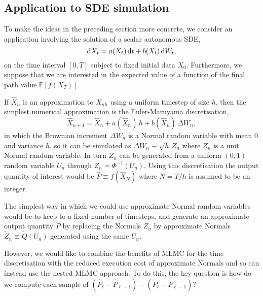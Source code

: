 \documentclass[review]{siamart190516}
\def \EE {{\mathbb{E}}}
\def \D {{\rm d}}
\def \tP {{\widetilde{P}}}
\def \tQ {{\widetilde{Q}}}
\def \tZ {{\widetilde{Z}}}
\def \hP {{\widehat{P}}}
\def \hX {{\widehat{X}}}
\def \hXn {{\widehat{X}_n}}
\def \hXnp {{\widehat{X}_{n+1}}}
\begin{document}
\subsection{Application to SDE simulation}

To make the ideas in the preceding section more concrete, we consider
an application involving the solution of a scalar autonomous SDE,
\[
\D X_t = a(X_t)\, \D t + b(X_t)\, \D W_t,
\]
on the time interval $[0,T]$ subject to fixed initial data $X_0$.
Furthermore, we suppose that we are interested in the expected
value of a function of the final path value $\EE[f(X_T)]$.

If $\hXn$ is an approximation to $X_{nh}$ using a uniform timestep of size $h$,
then the simplest numerical approximation is the Euler-Maruyama discretisation,
\[
\hXnp = \hXn + a(\hXn)\, h + b(\hXn)\, \Delta W_n,
\]
in which the Brownian increment $\Delta W_n$ is a Normal random
variable with mean 0 and variance $h$, so it can be simulated as
$
\Delta W_n \equiv \sqrt{h}\, Z_n
$
where $Z_n$ is a unit Normal random variable.  In turn $Z_n$ can 
be generated from a uniform $(0,1)$ random variable $U_n$ through 
$Z_n = \Phi^{-1}(U_n)$.
Using this discretisation the output quantity of interest would
be $\hP \equiv f(\hX_N)$ where $N = T/h$ is assumed to be an integer.

The simplest way in which we could use approximate Normal random
variables would be to keep to a fixed number of timesteps, and
generate an approximate output quantity $\tP$ by replacing the
Normals $Z_n$ by approximate Normals $\tZ_n \equiv \tQ(U_n)$
generated using the same $U_n$.

However, we would like to combine the benefits of MLMC for the time
discretisation with the reduced execution cost of approximate
Normals and so can instead use the nested MLMC approach.
To do this, the key question is how do we compute each sample of
$(\hP_\ell {-} \hP_{\ell-1}) - (\tP_\ell {-} \tP_{\ell-1})$?
\end{document}
